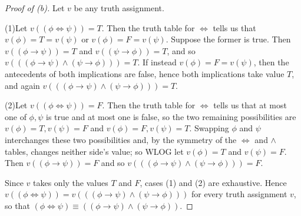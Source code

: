 \documentclass{article}
\theoremstyle{remark}\newtheorem{remark}{Remark}
\theoremstyle{plain}
\begin{document}
\begin{proof}[Proof of (b)]
    Let $v$ be any truth assignment.

    \smallskip\noindent
    (1)\enspace Let $v((\phi \iff \psi)) = T$. Then the truth table
    for $\iff$ tells us that $v(\phi) = T = v(\psi)$ or
    $v(\phi) = F = v(\psi)$. Suppose the former is true. Then
    $v((\phi \to \psi)) = T$ and $v((\psi \to \phi)) = T$, and so
    $v(((\phi \to \psi) \land (\psi \to \phi))) = T$. If instead
    $v(\phi) = F = v(\psi)$, then the antecedents of both implications are
    false, hence both implications take value $T$, and again
    $v(((\phi \to \psi) \land (\psi \to \phi))) = T$.

    \smallskip\noindent
    (2)\enspace Let $v((\phi \iff \psi)) = F$. Then the truth table
    for $\iff$ tells us that at most one of $\phi, \psi$ is true
    and at most one is false, so the two remaining possibilities are
    $v(\phi) = T, v(\psi) = F$ and $v(\phi) = F, v(\psi) = T$. Swapping
    $\phi$ and $\psi$ interchanges these two possibilities and, by the
    symmetry of the $\iff$ and $\land$ tables, changes neither
    side's value; so WLOG let $v(\phi) = T$ and $v(\psi) = F$. Then
    $v((\phi \to \psi)) = F$ and so
    $v(((\phi \to \psi) \land (\psi \to \phi))) = F$.

    \smallskip
    Since $v$ takes only the values $T$ and $F$, cases (1) and (2) are
    exhaustive. Hence
    $v((\phi \iff \psi)) = v(((\phi \to \psi) \land (\psi \to \phi)))$
    for every truth assignment $v$, so that
    $(\phi \iff \psi) \equiv ((\phi \to \psi) \land (\psi \to \phi))$.
\end{proof}
\end{document}
